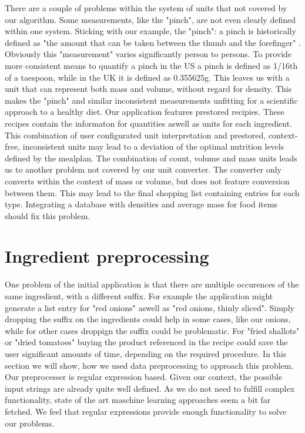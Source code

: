 There are a couple of problems within the system of units that not covered by our algorithm. Some measurements, like the "pinch", are not even clearly defined within one system. Sticking with our example, the "pinch": a pinch is historically defined as "the amount that can be taken between the thumb and the forefinger" \cite{rowlett2000dictionary}. Obviously this "measurement" varies significantly person to persons. To provide more consistent means to quantify a pinch in the US a pinch is defined as 1/16th of a taespoon, while in the UK it is defined as 0.355625g. This leaves us with a unit that can represent both mass and volume, without regard for density. This makes the "pinch" and similar inconsistent measurements unfitting for a scientific approach to a healthy diet. Our application features prestored recipies. These recipes contain the informaton for quantities aswell as units for each ingredient. This combination of user configurated unit interpretation and prestored, context-free, inconsistent units may lead to a deviation of the optimal nutrition levels defined by the mealplan.
The combination of count, volume and mass units leads us to another problem not covered by our unit converter. The converter only converts within the context of mass or volume, but does not feature conversion between them. This may lead to the final shopping list containing entries for each type. Integrating a database with densities and average mass for food items should fix this problem.


\section{Ingredient preprocessing}\label{section:preprocessing}
One problem of the initial application is that there are multiple occurences of the same ingredient, with a different suffix. For example the application might generate a list entry for "red onions" aswell as "red onions, thinly sliced". Simply dropping the suffix on the ingredients could help in some cases, like our onions, while for other cases droppign the suffix could be problematic. For "fried shallots" or "dried tomatoes" buying the product referenced in the recipe could save the user significant amounts of time, depending on the required procedure. In this section we will show, how we used data preprocessing to approach this problem.
Our preprocesser is regular expression based. Given our context, the possible input strings are already quite well defined. As we do not need to fulfill complex functionality, state of the art maschine learning approaches seem a bit far fetched. We feel that regular expressions provide enough functionality to solve our problems.

